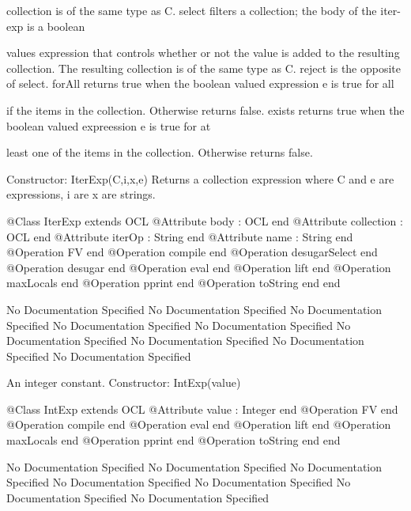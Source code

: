           collection is of the same type as C.
        select filters a collection; the body of the iter-exp is a boolean

          values expression that controls whether or not the value is added to the 
          resulting collection. The resulting collection is of the same type as C.
        reject is the opposite of select.
        forAll returns true when the boolean valued expression e is true for all

          if the items in the collection. Otherwise returns false.
        exists returns true when the boolean valued expreession e is true for at

          least one of the items in the collection. Otherwise returns false.
        
     Constructor: IterExp(C,i,x,e)
       Returns a collection expression where C and e are expressions, i are x are strings.
\begin{Interface}
@Class IterExp extends OCL
  @Attribute body : OCL end
  @Attribute collection : OCL end
  @Attribute iterOp : String end
  @Attribute name : String end
  @Operation FV end
  @Operation compile end
  @Operation desugarSelect end
  @Operation desugar end
  @Operation eval end
  @Operation lift end
  @Operation maxLocals end
  @Operation pprint end
  @Operation toString end
end
\end{Interface}
No Documentation Specified
No Documentation Specified
No Documentation Specified
No Documentation Specified
No Documentation Specified
No Documentation Specified
No Documentation Specified
No Documentation Specified
No Documentation Specified

      An integer constant.
      Constructor: IntExp(value)
\begin{Interface}
@Class IntExp extends OCL
  @Attribute value : Integer end
  @Operation FV end
  @Operation compile end
  @Operation eval end
  @Operation lift end
  @Operation maxLocals end
  @Operation pprint end
  @Operation toString end
end
\end{Interface}
No Documentation Specified
No Documentation Specified
No Documentation Specified
No Documentation Specified
No Documentation Specified
No Documentation Specified
No Documentation Specified

